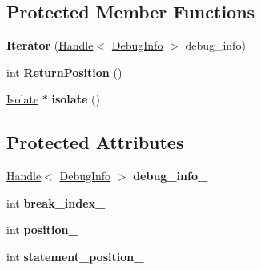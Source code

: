 \subsection*{Protected Member Functions}
\begin{DoxyCompactItemize}
\item 
{\bfseries Iterator} (\hyperlink{classv8_1_1internal_1_1_handle}{Handle}$<$ \hyperlink{classv8_1_1internal_1_1_debug_info}{Debug\+Info} $>$ debug\+\_\+info)\hypertarget{classv8_1_1internal_1_1_break_location_1_1_iterator_af75e7bc3be212930b7a58160316276a1}{}\label{classv8_1_1internal_1_1_break_location_1_1_iterator_af75e7bc3be212930b7a58160316276a1}

\item 
int {\bfseries Return\+Position} ()\hypertarget{classv8_1_1internal_1_1_break_location_1_1_iterator_a10d8a056e4eca971a9a6adbc8d912908}{}\label{classv8_1_1internal_1_1_break_location_1_1_iterator_a10d8a056e4eca971a9a6adbc8d912908}

\item 
\hyperlink{classv8_1_1internal_1_1_isolate}{Isolate} $\ast$ {\bfseries isolate} ()\hypertarget{classv8_1_1internal_1_1_break_location_1_1_iterator_a97968381dd36d3eea102f88aaa4c19c0}{}\label{classv8_1_1internal_1_1_break_location_1_1_iterator_a97968381dd36d3eea102f88aaa4c19c0}

\end{DoxyCompactItemize}
\subsection*{Protected Attributes}
\begin{DoxyCompactItemize}
\item 
\hyperlink{classv8_1_1internal_1_1_handle}{Handle}$<$ \hyperlink{classv8_1_1internal_1_1_debug_info}{Debug\+Info} $>$ {\bfseries debug\+\_\+info\+\_\+}\hypertarget{classv8_1_1internal_1_1_break_location_1_1_iterator_a0427691ed13aef0877121c912a62b197}{}\label{classv8_1_1internal_1_1_break_location_1_1_iterator_a0427691ed13aef0877121c912a62b197}

\item 
int {\bfseries break\+\_\+index\+\_\+}\hypertarget{classv8_1_1internal_1_1_break_location_1_1_iterator_a7268d4d96ce66ca1b425966bdd6d1ffc}{}\label{classv8_1_1internal_1_1_break_location_1_1_iterator_a7268d4d96ce66ca1b425966bdd6d1ffc}

\item 
int {\bfseries position\+\_\+}\hypertarget{classv8_1_1internal_1_1_break_location_1_1_iterator_a5e253d14c12a3a3c051868dfde2d66a5}{}\label{classv8_1_1internal_1_1_break_location_1_1_iterator_a5e253d14c12a3a3c051868dfde2d66a5}

\item 
int {\bfseries statement\+\_\+position\+\_\+}\hypertarget{classv8_1_1internal_1_1_break_location_1_1_iterator_a761d018aac6d941babbed806b2a01d30}{}\label{classv8_1_1internal_1_1_break_location_1_1_iterator_a761d018aac6d941babbed806b2a01d30}

\end{DoxyCompactItemize}
